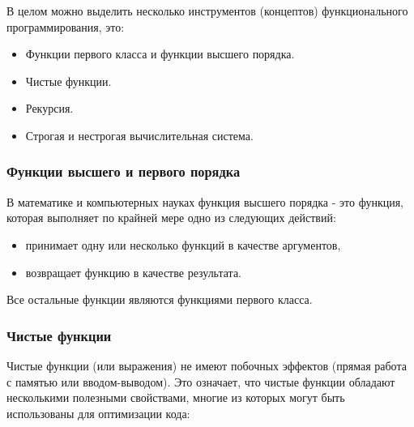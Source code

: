 В целом можно выделить несколько инструментов (концептов) функционального программирования, это:

\begin{itemize}
	\item Функции первого класса и функции высшего порядка.
	\item Чистые функции.
	\item Рекурсия.
	\item Строгая и нестрогая вычислительная система.
\end{itemize}

\subsubsection{Функции высшего и первого порядка}

В математике и компьютерных науках функция высшего порядка - это функция, которая выполняет по крайней мере одно из следующих действий:

\begin{itemize}
	\item принимает одну или несколько функций в качестве аргументов,
	\item возвращает функцию в качестве результата.
\end{itemize}

Все остальные функции являются функциями первого класса.

\subsubsection{Чистые функции}

Чистые функции (или выражения) не имеют побочных эффектов (прямая работа с памятью или вводом-выводом).
Это означает, что чистые функции обладают несколькими полезными свойствами, многие из которых могут быть использованы для оптимизации кода:

